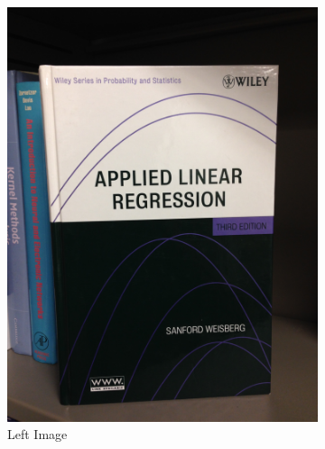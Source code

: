 \documentclass[11pt,psfig]{article}
\begin{document}
\begin{figure}
        \centering
        \begin{subfigure}[b]{0.4\textwidth}
                \includegraphics[width=\textwidth]{book1.jpg}
		\caption{Left Image}
        \end{subfigure}
        \begin{subfigure}[b]{0.4\textwidth}

\end{subfigure}
\end{figure}
\end{document}
